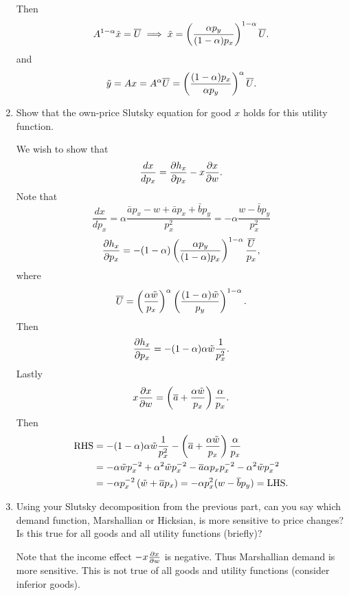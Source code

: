 \documentclass[11pt]{article}
\begin{document}
\begin{enumerate}
\begin{sol}
        Then \[
        A^{1-\alpha} \tilde x = \overline U \implies \tilde x = \left({\frac{\alpha p_y}{(1- \alpha) p_x}}\right)^{1-\alpha} \overline U.
        \]
        and \[
        \tilde y = A x = A^{\alpha} \overline U = \left({\frac{(1- \alpha)p_x}{\alpha p_y}}\right)^\alpha \overline U.
        \]    
    \end{sol}
    \item Show that the own-price Slutsky equation for good $x$ holds for this utility function.
    \begin{sol}
        We wish to show that \[
        \frac{dx}{dp_x} = \frac{\partial{h_x}}{\partial{p_x}} - x \frac{\partial{x}}{\partial{w}}.
        \]
        Note that \[\frac{dx}{dp_x} = \alpha \frac{\bar a p_x - w + \bar a p_x + \bar b p_y}{p_x^2} = -\alpha \frac{w - \bar b p_y}{p_x^2} \]
        \[
        \frac{\partial{h_x}}{\partial{p_x}} = - (1-\alpha) \left({\frac{\alpha p_y}{(1- \alpha) p_x}}\right)^{1-\alpha} \frac{\overline U}{p_x},
        \]
        where \[\overline U = \left({\frac{\alpha \tilde w}{p_x}}\right)^\alpha \left({\frac{(1-\alpha) \tilde w}{p_y}}\right)^{1-\alpha}.\]
        Then \[
        \frac{\partial{h_x}}{\partial{p_x}}
= -(1-\alpha) \alpha \tilde w \frac{1}{p_x^2}.
        \]
        Lastly \[
        x\frac{\partial{x}}{\partial{w}} = \left({\overline a + \frac{\alpha \tilde w}{p_x}}\right)\frac{\alpha}{p_x}.
        \]
        Then \begin{align*}
        \text{RHS} &= -(1-\alpha) \alpha \tilde w \frac{1}{p_x^2} - \left({\overline a + \frac{\alpha \tilde w}{p_x}}\right)\frac{\alpha}{p_x} \\
        &= -\alpha \tilde w p_x^{-2} + \alpha^2 \tilde w p_x^{-2} - \overline a \alpha p_x p_x^{-2} - \alpha^2 \tilde w p_x^{-2} \\
        &= -\alpha p_x^{-2} \left({\tilde w + \overline a p_x}\right) = -\alpha p_x^2 (w - \overline b p_y) = \text{LHS}.
        \end{align*}
        \end{sol}
        \item Using your Slutsky decomposition from the previous part, can you say which demand function, Marshallian or Hicksian, is more sensitive to price changes? Is this true for all goods and all utility functions (briefly)?
        \begin{sol}
            Note that the income effect $-x\frac{\partial{x}}{\partial{w}}$ is negative. Thus Marshallian demand is more sensitive. This is not true of all goods and utility functions (consider inferior goods). 
        \end{sol}

\end{enumerate}
\end{document}
